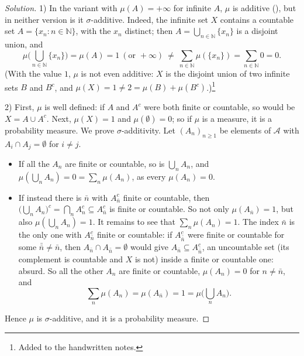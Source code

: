 \begin{proof}[Solution]
1) In the variant with $\mu(A)=+\infty$ for infinite $A$, $\mu$ is additive
(), but in neither version is it $\sigma$-additive. Indeed, the
infinite set $X$ contains a countable set $A=\{x_n:n\in\mathbb N\}$, with the $x_n$
distinct; then $A=\bigcup_{n\in\mathbb N}\{x_n\}$ is a disjoint union, and
\[
  \mu\Big(\bigcup_{n\in\mathbb N}\{x_n\}\Big)=\mu(A)=1\ (\text{or }+\infty)
  \ \ne\ \sum_{n\in\mathbb N}\mu(\{x_n\})=\sum_{n\in\mathbb N}0=0 .
\]
(With the value $1$, $\mu$ is not even additive: $X$ is the disjoint union of two infinite
sets $B$ and $B^c$, and $\mu(X)=1\ne2=\mu(B)+\mu(B^c)$.)\footnote{Added to the handwritten notes.}

2) First, $\mu$ is well defined: if $A$ and $A^c$ were both finite or countable, so would be
$X=A\cup A^c$. Next, $\mu(X)=1$ and $\mu(\emptyset)=0$; so if $\mu$ is a measure, it is a
probability measure. We prove $\sigma$-additivity. Let $(A_n)_{n\ge1}$ be elements of
$\mathcal A$ with $A_i\cap A_j=\emptyset$ for $i\ne j$.
\begin{itemize}
  \item If all the $A_n$ are finite or countable, so is $\bigcup_nA_n$, and
    $\mu(\bigcup_nA_n)=0=\sum_n\mu(A_n)$, as every $\mu(A_n)=0$.
  \item If instead there is $\bar n$ with $A_{\bar n}^c$ finite or countable, then
    $\big(\bigcup_nA_n\big)^c=\bigcap_nA_n^c\subseteq A_{\bar n}^c$ is finite or countable.
    So not only $\mu(A_{\bar n})=1$, but also $\mu(\bigcup_nA_n)=1$. It remains to see that
    $\sum_n\mu(A_n)=1$. The index $\bar n$ is the only one with $A_{\bar n}^c$ finite or
    countable: if $A_{\bar{\bar n}}^c$ were finite or countable for some $\bar{\bar n}\ne\bar n$,
    then $A_{\bar n}\cap A_{\bar{\bar n}}=\emptyset$ would give
    $A_{\bar n}\subseteq A_{\bar{\bar n}}^c$, an uncountable set (its complement is
    countable and $X$ is not) inside a finite or countable one: absurd. So all the other $A_n$
    are finite or countable, $\mu(A_n)=0$ for $n\ne\bar n$, and
    \[
      \sum_n\mu(A_n)=\mu(A_{\bar n})=1=\mu\Big(\bigcup_nA_n\Big).
    \]
\end{itemize}
Hence $\mu$ is $\sigma$-additive, and it is a probability measure.
\end{proof}

